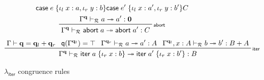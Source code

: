 \documentclass[acmsmall,screen,review]{acmart}
\newcommand{\mc}[1]{\ensuremath{\mathcal{#1}}}
\newcommand{\mb}[1]{\ensuremath{\mathbf{#1}}}
\newcommand{\ms}[1]{\ensuremath{\mathsf{#1}}}
\newcommand{\lto}{:}
\newcommand{\linl}[1]{\iota_l\;{#1}}
\newcommand{\linr}[1]{\iota_r\;{#1}}
\newcommand{\labort}[1]{\ms{abort}\;{#1}}
\newcommand{\caseexpr}[5]{\ms{case}\;#1\;\{\linl{#2} \lto #3, \linr{#4} \lto #5\}}
\newcommand{\liter}[3]{\ms{iter}\;#1\;\{ \linr{#2} \lto #3 \}}
\newcommand{\qsp}[4]{#1 \vdash #2 = #3 + #4}
\newcommand{\rle}[1]{{\scriptsize\textsf{#1}}}
\newcommand{\tref}{\twoheadrightarrow}
\newcommand{\tmle}[5]{#1 \vdash_{#2} #3 \tref #4 : {#5}}
\newcommand{\subiterexp}{\texorpdfstring{\(\lambda_{\ms{iter}}\)}{lambda-iter}}
\newcommand{\alquant}{\ms{q}}
\begin{document}
\begin{figure}
\begin{gather*}
{        {\caseexpr{e}{x}{a}{y}{b}}{\caseexpr{e'}{x}{a'}{y}{b'}}{C}} \\
    \prftree[r]{\rle{abort}}
      {\tmle{\Gamma^{\mb{q}}}{\mc{R}}{a}{a'}{\mb{0}}}
      {\tmle{\Gamma^{\mb{q}}}{\mc{R}}{\labort{a}}{\labort{a'}}{C}}
  \end{gather*}
  \begin{gather*}
    \prftree[r]{\rle{iter}}
      {\qsp{\Gamma}{\mb{q}}{\mb{q}_l}{\mb{q}_r}}
      {\alquant(\Gamma^{\mb{q}_l}) = \top}
      {\tmle{\Gamma^{\mb{q}_r}}{\mc{R}}{a}{a'}{A}}
      {\tmle{\Gamma^{\mb{q}_l}, x : A}{\mc{R}}{b}{b'}{B + A}}
      {\tmle{\Gamma^{\mb{q}}}{\mc{R}}{\liter{a}{x}{b}}{\liter{a'}{x}{b'}}{B}}
  \end{gather*}
  \caption{\subiterexp{} congruence rules}
  \Description{}
  \label{fig:congruence-refinement}
\end{figure}
\end{document}

